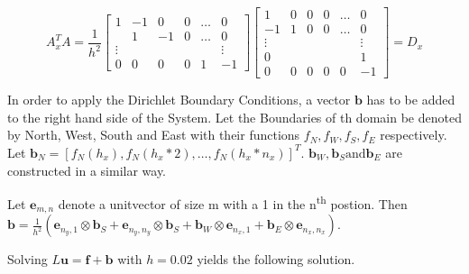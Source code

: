 \documentclass{article}
\begin{document}
\begin{equation}
    A_x^T A = \frac{1}{h^2}
    \begin{bmatrix}
        {1}         & {-1}   & {0}   & {0}   & {\ldots}  & {0} \\
        {}        & {1}   & {-1}   & {0}   & {\ldots}  & {0} \\
        {\vdots}    & {}   & {}    & {}    & {}        & {\vdots} \\
        {0}         & {0}    & {0}   & {0}   & {1}       & {-1}
        \end{bmatrix}
    \begin{bmatrix}
    {1} & {0} & {0} & {0} & {\ldots} & {0} \\
    {-1} & {1} & {0} & {0} & {\ldots} & {0} \\
    {\vdots} & {} & {} & {} & {} & {\vdots} \\
    {0} & {} & {} & {} & {} & {1} \\
     {0} & {0} & {0} & {0} & {0} & {-1}
    \end{bmatrix}= D_x
\end{equation}


In order to apply the Dirichlet Boundary Conditions, a vector $\mathbf{b}$ has to be added to the right hand side of the System. Let the Boundaries of th domain be denoted by North, West, South and East with their functions $f_N, f_W, f_S, f_E$ respectively. Let $\mathbf{b}_N = \left[f_N(h_x), f_N(h_x*2), \dots, f_N(h_x*n_x)\right]^T$. $\mathbf{b}_W, \mathbf{b}_S \text{and} \mathbf{b}_E$ are constructed in a similar way.\par
Let $\mathbf{e}_{m,n}$ denote a unitvector of size m with a 1 in the n\textsuperscript{th} postion.
Then $\mathbf{b} = \frac{1}{h^2}(\mathbf{e}_{n_y,1} \otimes \mathbf{b}_S + \mathbf{e}_{n_y,n_y} \otimes \mathbf{b}_S + \mathbf{b}_W \otimes \mathbf{e}_{n_x,1} + \mathbf{b}_E \otimes \mathbf{e}_{n_x,n_x})$.

Solving $L\mathbf{u} = \mathbf{f}+\mathbf{b}$ with $h=0.02$ yields the following solution.
\end{document}
